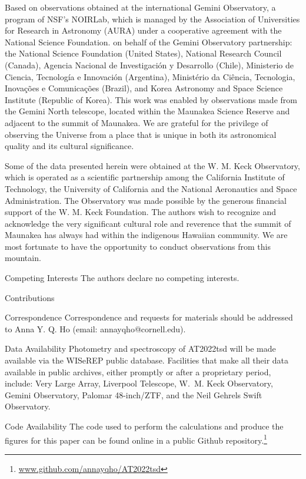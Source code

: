 \documentclass{nature_plusfigure}
\begin{document}
\begin{addendum}
Based on observations obtained at the international Gemini Observatory, a program of NSF’s NOIRLab, which is managed by the Association of Universities for Research in Astronomy (AURA) under a cooperative agreement with the National Science Foundation. on behalf of the Gemini Observatory partnership: the National Science Foundation (United States), National Research Council (Canada), Agencia Nacional de Investigaci\'{o}n y Desarrollo (Chile), Ministerio de Ciencia, Tecnolog\'{i}a e Innovaci\'{o}n (Argentina), Minist\'{e}rio da Ci\^{e}ncia, Tecnologia, Inova\c{c}\~{o}es e Comunica\c{c}\~{o}es (Brazil), and Korea Astronomy and Space Science Institute (Republic of Korea). This work was enabled by observations made from the Gemini North telescope, located within the Maunakea Science Reserve and adjacent to the summit of Maunakea. We are grateful for the privilege of observing the Universe from a place that is unique in both its astronomical quality and its cultural significance.

Some of the data presented herein were obtained at the W. M. Keck Observatory, which is operated as a scientific partnership among the California Institute of Technology, the University of California and the National Aeronautics and Space Administration. The Observatory was made possible by the generous financial support of the W. M. Keck Foundation.
The authors wish to recognize and acknowledge the very significant cultural role and reverence that the summit of Maunakea has always had within the indigenous Hawaiian community.  We are most fortunate to have the opportunity to conduct observations from this mountain.




 \item[Competing Interests] The authors declare no competing interests.

\item[Contributions] 

 \item[Correspondence] Correspondence and requests for materials
should be addressed to Anna Y. Q. Ho (email: annayqho@cornell.edu).

 \item[Data Availability] Photometry and spectroscopy of AT2022tsd will be made available via the WISeREP public database. Facilities that make all their data available in public archives, either promptly or after a proprietary period, include: Very Large Array, Liverpool Telescope, W.~M. Keck Observatory, Gemini Observatory, Palomar 48-inch/ZTF, 
 and the Neil Gehrels Swift Observatory. 

 \item[Code Availability] The code used to perform the calculations and produce the figures for this paper can be found online in a public Github repository.\footnote{\url{www.github.com/annayqho/AT2022tsd}}

\end{addendum}
\end{document}

